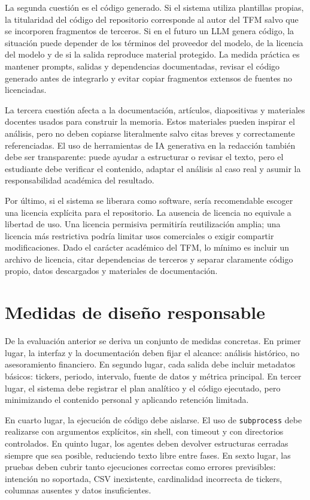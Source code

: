 \documentclass{article}
\begin{document}
La segunda cuestión es el código generado. Si el sistema utiliza plantillas propias, la titularidad del código del repositorio corresponde al autor del TFM salvo que se incorporen fragmentos de terceros. Si en el futuro un LLM genera código, la situación puede depender de los términos del proveedor del modelo, de la licencia del modelo y de si la salida reproduce material protegido. La medida práctica es mantener prompts, salidas y dependencias documentadas, revisar el código generado antes de integrarlo y evitar copiar fragmentos extensos de fuentes no licenciadas.

La tercera cuestión afecta a la documentación, artículos, diapositivas y materiales docentes usados para construir la memoria. Estos materiales pueden inspirar el análisis, pero no deben copiarse literalmente salvo citas breves y correctamente referenciadas. El uso de herramientas de IA generativa en la redacción también debe ser transparente: puede ayudar a estructurar o revisar el texto, pero el estudiante debe verificar el contenido, adaptar el análisis al caso real y asumir la responsabilidad académica del resultado.

Por último, si el sistema se liberara como software, sería recomendable escoger una licencia explícita para el repositorio. La ausencia de licencia no equivale a libertad de uso. Una licencia permisiva permitiría reutilización amplia; una licencia más restrictiva podría limitar usos comerciales o exigir compartir modificaciones. Dado el carácter académico del TFM, lo mínimo es incluir un archivo de licencia, citar dependencias de terceros y separar claramente código propio, datos descargados y materiales de documentación.

\section{Medidas de diseño responsable}

De la evaluación anterior se deriva un conjunto de medidas concretas. En primer lugar, la interfaz y la documentación deben fijar el alcance: análisis histórico, no asesoramiento financiero. En segundo lugar, cada salida debe incluir metadatos básicos: tickers, periodo, intervalo, fuente de datos y métrica principal. En tercer lugar, el sistema debe registrar el plan analítico y el código ejecutado, pero minimizando el contenido personal y aplicando retención limitada.

En cuarto lugar, la ejecución de código debe aislarse. El uso de \texttt{subprocess} debe realizarse con argumentos explícitos, sin shell, con timeout y con directorios controlados. En quinto lugar, los agentes deben devolver estructuras cerradas siempre que sea posible, reduciendo texto libre entre fases. En sexto lugar, las pruebas deben cubrir tanto ejecuciones correctas como errores previsibles: intención no soportada, CSV inexistente, cardinalidad incorrecta de tickers, columnas ausentes y datos insuficientes.
\end{document}
